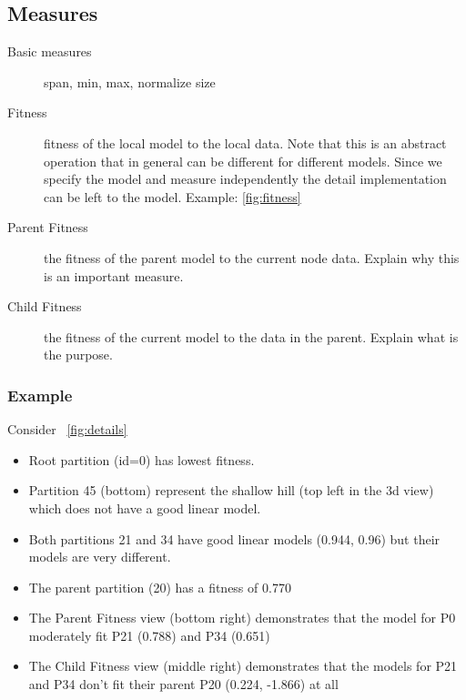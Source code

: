 \subsection{Measures}
\label{sec:measures}

\begin{description}
\item[Basic measures] span, min, max, normalize size

\item[Fitness] fitness of the local model to the local data. Note that this is an abstract operation that in general can be different for different models. Since we specify the model and measure independently the detail implementation can be left to the model. Example: \autoref{fig:fitness}

\item[Parent Fitness] the fitness of the parent model to the current node data. Explain why this is an important  measure.

\item[Child Fitness] the fitness of the current model to the data in the parent. Explain what is the purpose.

\end{description}


\subsubsection*{Example}
Consider ~\autoref{fig:details}
\begin{itemize}
    \item Root partition (id=0) has lowest fitness. 
    \item Partition 45 (bottom) represent the shallow hill (top left in the 3d view) which does not have a good linear model.
    \item Both partitions 21 and 34 have good linear models (0.944, 0.96) but their models are very different. 
    \item The parent partition (20) has a fitness of 0.770
    \item The Parent Fitness view (bottom right) demonstrates that the model for P0 moderately fit P21 (0.788) and P34 (0.651)
    \item The Child Fitness view (middle right) demonstrates that the models for P21 and P34 don't fit their parent P20 (0.224, -1.866) at all  
 \end{itemize}

